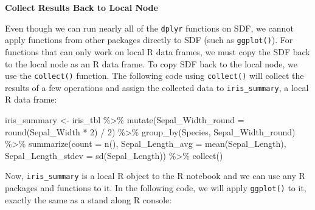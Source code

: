 \documentclass[
  12pt,
]{krantz}
\makeatletter
\newenvironment{Shaded}{\begin{snugshade}}{\end{snugshade}}
\newcommand{\AttributeTok}[1]{\textcolor[rgb]{0.61,0.61,0.61}{#1}}
\newcommand{\DecValTok}[1]{\textcolor[rgb]{0.06,0.06,0.06}{#1}}
\newcommand{\FunctionTok}[1]{\textcolor[rgb]{0,0,0}{#1}}
\newcommand{\NormalTok}[1]{#1}
\newcommand{\OtherTok}[1]{\textcolor[rgb]{0.37,0.37,0.37}{#1}}
\newcommand{\SpecialCharTok}[1]{\textcolor[rgb]{0,0,0}{#1}}
\newenvironment{kframe}{%
\medskip{}
\setlength{\fboxsep}{.8em}
 \def\at@end@of@kframe{}%
 \ifinner\ifhmode%
  \def\at@end@of@kframe{\end{minipage}}%
  \begin{minipage}{\columnwidth}%
 \fi\fi%
 \def\FrameCommand##1{\hskip\@totalleftmargin \hskip-\fboxsep
 \colorbox{shadecolor}{##1}\hskip-\fboxsep
     \hskip-\linewidth \hskip-\@totalleftmargin \hskip\columnwidth}%
 \MakeFramed {\advance\hsize-\width
   \@totalleftmargin\z@ \linewidth\hsize
   \@setminipage}}%
 {\par\unskip\endMakeFramed%
 \at@end@of@kframe}
\renewenvironment{Shaded}{\begin{kframe}}{\end{kframe}}
\makeatother
\begin{document}
\textbf{Collect Results Back to Local Node}

Even though we can run nearly all of the \texttt{dplyr} functions on SDF, we cannot apply functions from other packages directly to SDF (such as \texttt{ggplot()}). For functions that can only work on local R data frames, we must copy the SDF back to the local node as an R data frame. To copy SDF back to the local node, we use the \texttt{collect()} function. The following code using \texttt{collect()} will collect the results of a few operations and assign the collected data to \texttt{iris\_summary}, a local R data frame:

\begin{Shaded}
\begin{Highlighting}[]
\NormalTok{iris\_summary }\OtherTok{\textless{}{-}}\NormalTok{ iris\_tbl }\SpecialCharTok{\%\textgreater{}\%}
    \FunctionTok{mutate}\NormalTok{(}\AttributeTok{Sepal\_Width\_round =} \FunctionTok{round}\NormalTok{(Sepal\_Width }\SpecialCharTok{*} \DecValTok{2}\NormalTok{) }\SpecialCharTok{/} \DecValTok{2}\NormalTok{) }\SpecialCharTok{\%\textgreater{}\%}
    \FunctionTok{group\_by}\NormalTok{(Species, Sepal\_Width\_round) }\SpecialCharTok{\%\textgreater{}\%}
    \FunctionTok{summarize}\NormalTok{(}\AttributeTok{count =} \FunctionTok{n}\NormalTok{(), }\AttributeTok{Sepal\_Length\_avg =} \FunctionTok{mean}\NormalTok{(Sepal\_Length),}
    \AttributeTok{Sepal\_Length\_stdev =} \FunctionTok{sd}\NormalTok{(Sepal\_Length)) }\SpecialCharTok{\%\textgreater{}\%}
    \FunctionTok{collect}\NormalTok{()}
\end{Highlighting}
\end{Shaded}

Now, \texttt{iris\_summary} is a local R object to the R notebook and we can use any R packages and functions to it. In the following code, we will apply \texttt{ggplot()} to it, exactly the same as a stand along R console:
\end{document}
